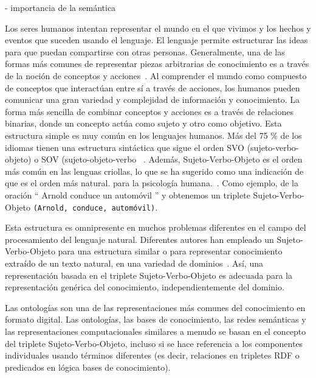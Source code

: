 - importancia de la semántica


Los seres humanos intentan representar el mundo en el que vivimos y los hechos y eventos que suceden usando el lenguaje. El lenguaje permite estructurar las ideas para que puedan compartirse con otras personas.
Generalmente, una de las formas más comunes de representar piezas arbitrarias de conocimiento es a través de la noción de conceptos y acciones~\cite{teleology}.
Al comprender el mundo como compuesto de conceptos que interactúan entre sí a través de acciones, los humanos pueden comunicar una gran variedad y complejidad de información y conocimiento.
La forma más sencilla de combinar conceptos y acciones es a través de relaciones binarias, donde un concepto actúa como sujeto y otro como objetivo.
Esta estructura simple es muy común en los lenguajes humanos.
Más del 75 \% de los idiomas tienen una estructura sintáctica que sigue el orden SVO (sujeto-verbo-objeto) o SOV (sujeto-objeto-verbo ~\cite{cambridge}.
Además, Sujeto-Verbo-Objeto es el orden más común en las lenguas criollas, lo que se ha sugerido como una indicación de que es el orden más natural.
para la psicología humana.~\cite{diamond2013rise}.
Como ejemplo, de la oración `` Arnold conduce un automóvil '' y obtenemos un triplete Sujeto-Verbo-Objeto \verb|(Arnold, conduce, automóvil)|.

Esta estructura es omnipresente en muchos problemas diferentes en el campo del procesamiento del lenguaje natural.
Diferentes autores han empleado un Sujeto-Verbo-Objeto para una estructura similar o para representar conocimiento extraído de un texto natural, en una variedad de dominios~\cite{mitchell2015never, emotinet}.
Así, una representación basada en el triplete Sujeto-Verbo-Objeto es adecuada para la representación genérica del conocimiento, independientemente del dominio.

Las ontologías son una de las representaciones más comunes del conocimiento en formato digital.
Las ontologías, las bases de conocimiento, las redes semánticas y las representaciones computacionales similares a menudo se basan en el concepto del triplete Sujeto-Verbo-Objeto, incluso si se hace referencia a los componentes individuales usando términos diferentes (es decir, relaciones en tripletes RDF o predicados en lógica bases de conocimiento).

